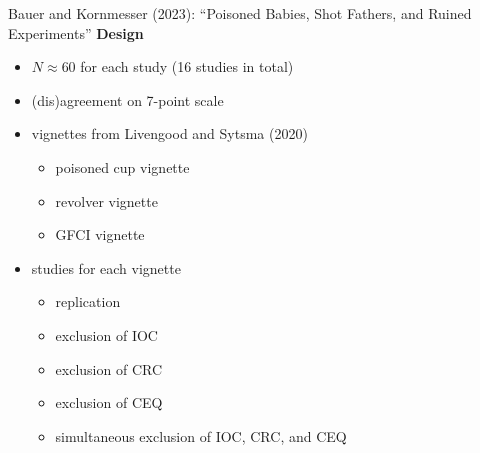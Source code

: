 \documentclass[xcolor=table,9pt,aspectratio=169]{beamer}
\begin{document}
\begin{frame}{\vspace*{10mm}Bauer and Kornmesser (2023): ``Poisoned Babies, Shot Fathers, and Ruined Experiments''}
\vspace*{-5mm}
\textbf{Design}\\
\begin{itemize}
   \item $N\approx 60$ for each study (16 studies in total)
   \item (dis)agreement on 7-point scale
   \item vignettes from Livengood and Sytsma (2020)
      \begin{itemize}
         \item poisoned cup vignette
         \item revolver vignette
         \item GFCI vignette
      \end{itemize}
   \item studies for each vignette
      \begin{itemize}
         \item replication
         \item exclusion of IOC
         \item exclusion of CRC
         \item exclusion of CEQ
         \item simultaneous exclusion of IOC, CRC, and CEQ
      \end{itemize}
\end{itemize}
\vfill
{}
\end{frame}
\end{document}

